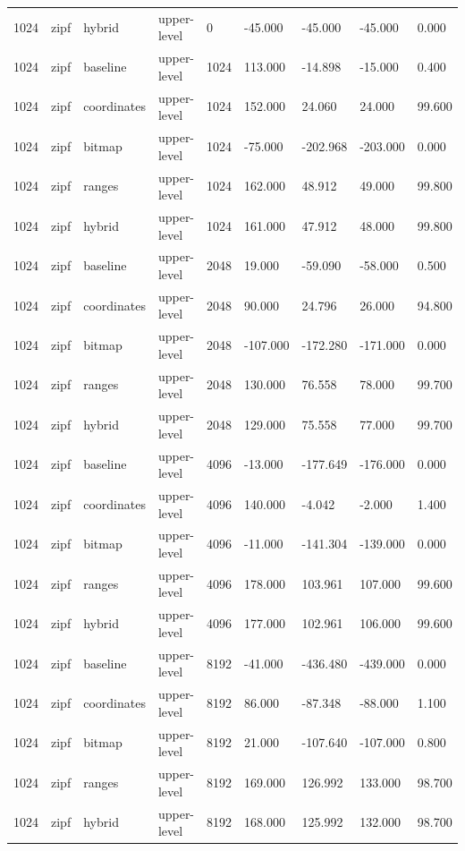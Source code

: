 \begin{tabular}{lllllllll}
1024 & zipf & hybrid & upper-level & 0 & -45.000 & -45.000 & -45.000 & 0.000 \\
1024 & zipf & baseline & upper-level & 1024 & 113.000 & -14.898 & -15.000 & 0.400 \\
1024 & zipf & coordinates & upper-level & 1024 & 152.000 & 24.060 & 24.000 & 99.600 \\
1024 & zipf & bitmap & upper-level & 1024 & -75.000 & -202.968 & -203.000 & 0.000 \\
1024 & zipf & ranges & upper-level & 1024 & 162.000 & 48.912 & 49.000 & 99.800 \\
1024 & zipf & hybrid & upper-level & 1024 & 161.000 & 47.912 & 48.000 & 99.800 \\
1024 & zipf & baseline & upper-level & 2048 & 19.000 & -59.090 & -58.000 & 0.500 \\
1024 & zipf & coordinates & upper-level & 2048 & 90.000 & 24.796 & 26.000 & 94.800 \\
1024 & zipf & bitmap & upper-level & 2048 & -107.000 & -172.280 & -171.000 & 0.000 \\
1024 & zipf & ranges & upper-level & 2048 & 130.000 & 76.558 & 78.000 & 99.700 \\
1024 & zipf & hybrid & upper-level & 2048 & 129.000 & 75.558 & 77.000 & 99.700 \\
1024 & zipf & baseline & upper-level & 4096 & -13.000 & -177.649 & -176.000 & 0.000 \\
1024 & zipf & coordinates & upper-level & 4096 & 140.000 & -4.042 & -2.000 & 1.400 \\
1024 & zipf & bitmap & upper-level & 4096 & -11.000 & -141.304 & -139.000 & 0.000 \\
1024 & zipf & ranges & upper-level & 4096 & 178.000 & 103.961 & 107.000 & 99.600 \\
1024 & zipf & hybrid & upper-level & 4096 & 177.000 & 102.961 & 106.000 & 99.600 \\
1024 & zipf & baseline & upper-level & 8192 & -41.000 & -436.480 & -439.000 & 0.000 \\
1024 & zipf & coordinates & upper-level & 8192 & 86.000 & -87.348 & -88.000 & 1.100 \\
1024 & zipf & bitmap & upper-level & 8192 & 21.000 & -107.640 & -107.000 & 0.800 \\
1024 & zipf & ranges & upper-level & 8192 & 169.000 & 126.992 & 133.000 & 98.700 \\
1024 & zipf & hybrid & upper-level & 8192 & 168.000 & 125.992 & 132.000 & 98.700 \\

\end{tabular}

